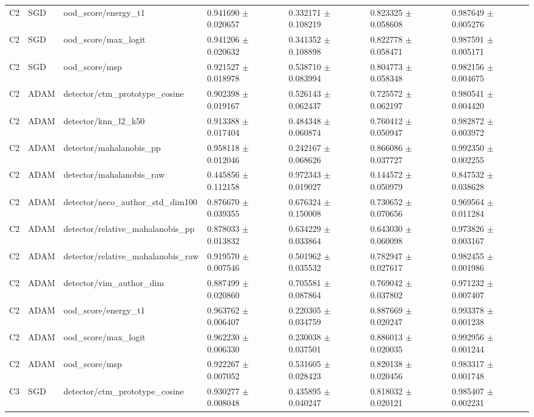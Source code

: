 \begin{longtable}{lllllll}
C2 & SGD & ood\_score/energy\_t1 & 0.941690 $\pm$ 0.020657 & 0.332171 $\pm$ 0.108219 & 0.823325 $\pm$ 0.058608 & 0.987649 $\pm$ 0.005276 \\
C2 & SGD & ood\_score/max\_logit & 0.941206 $\pm$ 0.020632 & 0.341352 $\pm$ 0.108898 & 0.822778 $\pm$ 0.058471 & 0.987591 $\pm$ 0.005171 \\
C2 & SGD & ood\_score/msp & 0.921527 $\pm$ 0.018978 & 0.538710 $\pm$ 0.083994 & 0.804773 $\pm$ 0.058348 & 0.982156 $\pm$ 0.004675 \\
C2 & ADAM & detector/ctm\_prototype\_cosine & 0.902398 $\pm$ 0.019167 & 0.526143 $\pm$ 0.062437 & 0.725572 $\pm$ 0.062197 & 0.980541 $\pm$ 0.004420 \\
C2 & ADAM & detector/knn\_l2\_k50 & 0.913388 $\pm$ 0.017404 & 0.484348 $\pm$ 0.060874 & 0.760412 $\pm$ 0.050947 & 0.982872 $\pm$ 0.003972 \\
C2 & ADAM & detector/mahalanobis\_pp & 0.958118 $\pm$ 0.012046 & 0.242167 $\pm$ 0.068626 & 0.866086 $\pm$ 0.037727 & 0.992350 $\pm$ 0.002255 \\
C2 & ADAM & detector/mahalanobis\_raw & 0.445856 $\pm$ 0.112158 & 0.972343 $\pm$ 0.019027 & 0.144572 $\pm$ 0.050979 & 0.847532 $\pm$ 0.038628 \\
C2 & ADAM & detector/neco\_author\_std\_dim100 & 0.876670 $\pm$ 0.039355 & 0.676324 $\pm$ 0.150008 & 0.730652 $\pm$ 0.070656 & 0.969564 $\pm$ 0.011284 \\
C2 & ADAM & detector/relative\_mahalanobis\_pp & 0.878033 $\pm$ 0.013832 & 0.634229 $\pm$ 0.033864 & 0.643030 $\pm$ 0.060098 & 0.973826 $\pm$ 0.003167 \\
C2 & ADAM & detector/relative\_mahalanobis\_raw & 0.919570 $\pm$ 0.007546 & 0.501962 $\pm$ 0.035532 & 0.782947 $\pm$ 0.027617 & 0.982455 $\pm$ 0.001986 \\
C2 & ADAM & detector/vim\_author\_dim & 0.887499 $\pm$ 0.020860 & 0.705581 $\pm$ 0.087864 & 0.769042 $\pm$ 0.037802 & 0.971232 $\pm$ 0.007407 \\
C2 & ADAM & ood\_score/energy\_t1 & 0.963762 $\pm$ 0.006407 & 0.220305 $\pm$ 0.034759 & 0.887669 $\pm$ 0.020247 & 0.993378 $\pm$ 0.001238 \\
C2 & ADAM & ood\_score/max\_logit & 0.962230 $\pm$ 0.006330 & 0.230038 $\pm$ 0.037501 & 0.886013 $\pm$ 0.020035 & 0.992956 $\pm$ 0.001244 \\
C2 & ADAM & ood\_score/msp & 0.922267 $\pm$ 0.007052 & 0.531605 $\pm$ 0.028423 & 0.820138 $\pm$ 0.020456 & 0.983317 $\pm$ 0.001748 \\
C3 & SGD & detector/ctm\_prototype\_cosine & 0.930277 $\pm$ 0.008048 & 0.435895 $\pm$ 0.040247 & 0.818032 $\pm$ 0.020121 & 0.985407 $\pm$ 0.002231 \\

\end{longtable}
